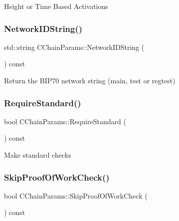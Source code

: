 Height or Time Based Activations \mbox{\label{class_c_chain_params_a2c02cc73f7fe9369cee9a39a0fd5b710}} 
\subsubsection{\texorpdfstring{Network\+I\+D\+String()}{NetworkIDString()}}
{\footnotesize\ttfamily std\+::string C\+Chain\+Params\+::\+Network\+I\+D\+String (\begin{DoxyParamCaption}{ }\end{DoxyParamCaption}) const\hspace{0.3cm}{\ttfamily [inline]}}

Return the B\+I\+P70 network string (main, test or regtest) \mbox{\label{class_c_chain_params_a30c1b60e515537b01810e175844d852f}} 
\subsubsection{\texorpdfstring{Require\+Standard()}{RequireStandard()}}
{\footnotesize\ttfamily bool C\+Chain\+Params\+::\+Require\+Standard (\begin{DoxyParamCaption}{ }\end{DoxyParamCaption}) const\hspace{0.3cm}{\ttfamily [inline]}}

Make standard checks \mbox{\label{class_c_chain_params_a79b6cb67af99906669f7219a14a83cf7}} 
\subsubsection{\texorpdfstring{Skip\+Proof\+Of\+Work\+Check()}{SkipProofOfWorkCheck()}}
{\footnotesize\ttfamily bool C\+Chain\+Params\+::\+Skip\+Proof\+Of\+Work\+Check (\begin{DoxyParamCaption}{ }\end{DoxyParamCaption}) const\hspace{0.3cm}{\ttfamily [inline]}}

